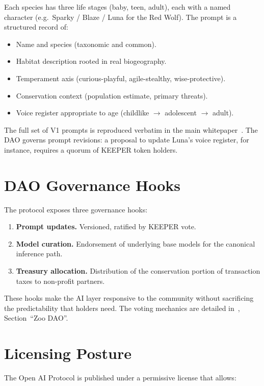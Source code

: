 \documentclass[11pt,letterpaper]{article}
\begin{document}
Each species has three life stages (baby, teen, adult), each with a named character (e.g.\ Sparky / Blaze / Luna for the Red Wolf). The prompt is a structured record of:

\begin{itemize}
  \item Name and species (taxonomic and common).
  \item Habitat description rooted in real biogeography.
  \item Temperament axis (curious-playful, agile-stealthy, wise-protective).
  \item Conservation context (population estimate, primary threats).
  \item Voice register appropriate to age (childlike $\to$ adolescent $\to$ adult).
\end{itemize}

The full set of V1 prompts is reproduced verbatim in the main whitepaper~\cite{zoo2021}. The DAO governs prompt revisions: a proposal to update Luna's voice register, for instance, requires a quorum of KEEPER token holders.

\section{DAO Governance Hooks}

The protocol exposes three governance hooks:

\begin{enumerate}
  \item \textbf{Prompt updates.} Versioned, ratified by KEEPER vote.
  \item \textbf{Model curation.} Endorsement of underlying base models for the canonical inference path.
  \item \textbf{Treasury allocation.} Distribution of the conservation portion of transaction taxes to non-profit partners.
\end{enumerate}

These hooks make the AI layer responsive to the community without sacrificing the predictability that holders need. The voting mechanics are detailed in~\cite{zoo2021}, Section~``Zoo DAO''.

\section{Licensing Posture}

The Open AI Protocol is published under a permissive license that allows:
\end{document}
